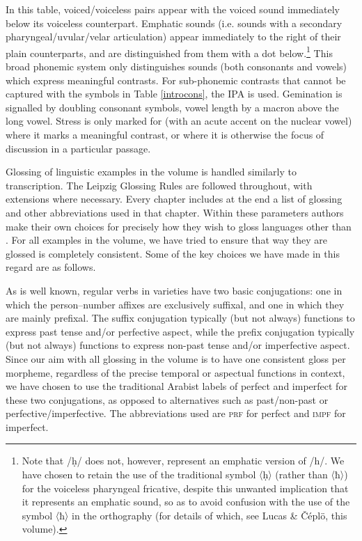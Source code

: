 \documentclass[output=paper]{langsci/langscibook}
\begin{document}
In this table, voiced/voiceless pairs appear with the voiced sound immediately below its voiceless counterpart. Emphatic sounds (i.e. sounds with a secondary {pharyngeal}/uvular/velar articulation) appear immediately to the right of their plain counterparts, and are distinguished from them with a dot below.\footnote{Note that /ḥ/ does not, however, represent an {emphatic} version of /h/. We have chosen to retain the use of the traditional symbol 〈ḥ〉 (rather than 〈ħ〉) for the voiceless {pharyngeal} fricative, despite this unwanted implication that it represents an {emphatic} sound, so as to avoid confusion with the use of the symbol 〈ħ〉 in the  {orthography} (for details of which, see Lucas \& Čéplö,  this volume).} This broad phonemic system only distinguishes sounds (both consonants and vowels) which express meaningful contrasts. For sub-phonemic contrasts that cannot be captured with the symbols in Table \ref{introcons}, the IPA is used. Gemination is signalled by doubling consonant symbols, {vowel length} by a macron above the {long vowel}. Stress is only marked for  (with an acute accent on the nuclear vowel) where it marks a meaningful contrast, or where it is otherwise the focus of discussion in a particular passage.

Glossing of linguistic examples in the volume is handled similarly to transcription. The Leipzig Glossing Rules are followed throughout, with extensions where necessary. Every chapter includes at the end a list of glossing and other abbreviations used in that chapter. Within these parameters authors make their own choices for precisely how they wish to gloss languages other than . For all  examples in the volume, we have tried to ensure that way they are glossed is completely consistent. Some of the key choices we have made in this regard are as follows.

As is well known, regular verbs in  varieties have two basic conjugations: one in which the person--number affixes are exclusively suffixal, and one in which they are mainly prefixal. The suffix conjugation typically (but not always) functions to express past {tense} and/or perfective aspect, while the prefix conjugation typically (but not always) functions to express non-past {tense} and/or imperfective aspect. Since our aim with all glossing in the volume is to have one consistent gloss per morpheme, regardless of the precise temporal or aspectual functions in context, we have chosen to use the traditional Arabist labels of perfect and imperfect for these two conjugations, as opposed to alternatives such as past/non-past or perfective/imperfective. The abbreviations used are \textsc{prf} for perfect and \textsc{impf} for imperfect.
\end{document}
